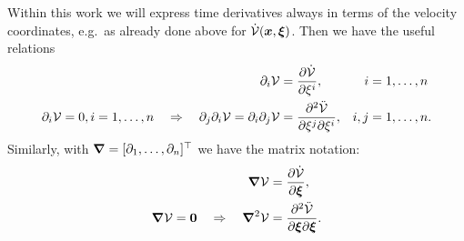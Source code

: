 Within this work we will express time derivatives always in terms of the velocity coordinates, e.g.\ as already done above for $\dot{\potentialEnergy}(\sysCoord, \sysVel)$.
Then we have the useful relations
\begin{subequations}
\begin{align}
 \dirDiff{\LidxI} \potentialEnergy &= \pdiff[\dot{\potentialEnergy}]{\sysVelCoeff{\LidxI}},&
 \LidxI &= 1,\ldots,\dimConfigSpace
\\
 \dirDiff{\LidxI} \potentialEnergy = 0, i=1,\ldots,\dimConfigSpace 
\quad \Rightarrow  \quad
 \dirDiff{\LidxII} \dirDiff{\LidxI} \potentialEnergy = \dirDiff{\LidxI} \dirDiff{\LidxII} \potentialEnergy &= \frac{\partial^2 \ddot{\potentialEnergy}}{\partial \sysVelCoeff{\LidxII} \partial \sysVelCoeff{\LidxI}},&
 \LidxI, \LidxII &= 1,\ldots,\dimConfigSpace
 .
\end{align}
\end{subequations}
Similarly, with $\differential = [\dirDiff{1}, \ldots ,\dirDiff{\dimConfigSpace}]^\top$ we have the matrix notation:
\begin{subequations}
\begin{align}
 \differential \potentialEnergy &= \pdiff[\dot{\potentialEnergy}]{\sysVel},
\\
 \differential \potentialEnergy = \tuple{0} 
\quad \Rightarrow  \quad
 \differential^2 \potentialEnergy &= \frac{\partial^2 \ddot{\potentialEnergy}}{\partial \sysVel \partial \sysVel}
 .
\end{align}
\end{subequations}


